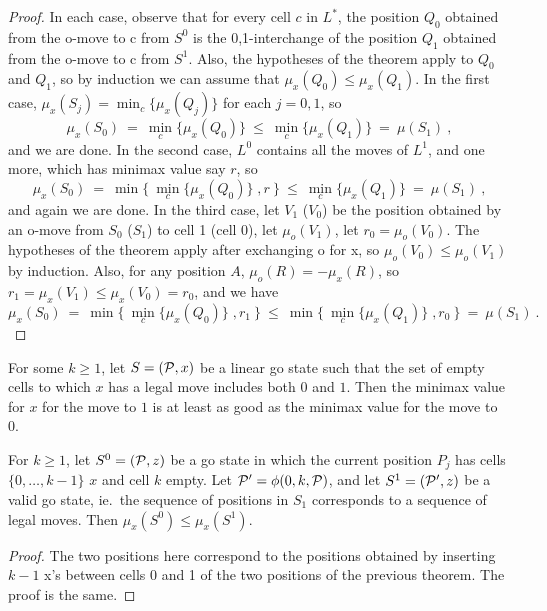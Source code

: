 \begin{proof}
In each case, observe that for every cell $c$ in $L^*$,
the position $Q_0$ obtained from the o-move to c from $S^0$ 
is the 0,1-interchange of 
the position $Q_1$ obtained from the o-move to c from $S^1$.
Also, the hypotheses of the theorem apply to $Q_0$ and $Q_1$,
so by induction we can assume that
$\mu_x(Q_0) \leq \mu_x(Q_1)$.
In the first case, $\mu_x(S_j) = \min_c \{\mu_x(Q_j)\}$
for each $j=0,1$, so
\[ \mu_x(S_0) \: = \: 
\min_c \{\mu_x(Q_0)\} \: \leq \:
\min_c \{\mu_x(Q_1)\} \: = \: 
\mu(S_1) \: , \]
and we are done.
In the second case, $L^0$ contains all the moves of $L^1$,
and one more, which has minimax value say $r$, so
\[ \mu_x(S_0) \: = \: 
\min \{ \: \min_c \{\mu_x(Q_0)\} \; , r \: \} \:  \leq \: 
\min_c \{\mu_x(Q_1)\} \: = \: 
\mu(S_1) \: , \]
and again we are done.
In the third case,
let $V_1$ ($V_0$) be the position
obtained by an o-move from $S_0$ ($S_1$) to cell 1 (cell 0),
let $\mu_o(V_1)$, let $r_0 = \mu_o(V_0)$.
The hypotheses of the theorem apply after exchanging o for x,
so $\mu_o(V_0) \leq \mu_o(V_1)$ by induction.
Also, for any position $A$, $\mu_o(R) = - \mu_x(R)$,
so $r_1 = \mu_x(V_1) \leq \mu_x(V_0) = r_0$, and we have
\[ \mu_x(S_0) \: = \: 
\min \{ \: \min_c \{\mu_x(Q_0)\} \; , r_1 \: \} \: \leq \: 
\min \{ \: \min_c \{\mu_x(Q_1)\} \; , r_0 \: \} \: = \:
\mu(S_1) \: . \]
\end{proof}


\begin{corollary}\label{cor}
For some $k\geq 1$,
let $S=({\mathcal{P}},x)$ be a linear go state
such that the set of empty cells to which
$x$ has a legal move includes both $0$ and $1$.
Then the minimax value for $x$ for the move to $1$
is at least as good as the minimax value for the move to 0.
\end{corollary}

\begin{theorem}
For $k\geq 1$,
let $S^0 =({\mathcal{P}},z)$ be a go state in which the current position
$P_j$ has cells $\{0,\ldots,k-1\}$ $x$ and cell $k$ empty.
Let ${\mathcal{P}}' = \phi(0,k,{\mathcal{P}})$, and let
$S^1 = ({\mathcal{P}}',z)$ be a valid go state, ie.\ the sequence
of positions in $S_1$ corresponds to a sequence of legal moves.
Then $\mu_x(S^0) \leq \mu_x(S^1)$.
\end{theorem}

\begin{proof}
The two positions here correspond to the positions obtained by
inserting $k-1$ x's between cells 0 and 1 
of the two positions of the previous theorem.
The proof is the same.
\end{proof}

